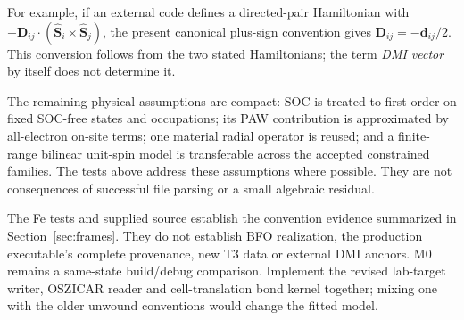 \documentclass[11pt,a4paper]{article}
\numberwithin{equation}{section}
\newcommand{\vct}[1]{\bm{#1}}
\begin{document}
For example, if an external code defines a directed-pair Hamiltonian with
$-\vct D_{ij}\cdot(\hat{\vct S}_i\times\hat{\vct S}_j)$, the present canonical
plus-sign convention gives $\vct D_{ij}=-\vct d_{ij}/2$.
This conversion follows from the two stated Hamiltonians; the term
\emph{DMI vector} by itself does not determine it.

The remaining physical assumptions are compact: SOC is treated to first
order on fixed SOC-free states and occupations; its PAW contribution is
approximated by all-electron on-site terms; one material radial operator
is reused; and a finite-range bilinear unit-spin model is transferable
across the accepted constrained families. The tests above address these
assumptions where possible. They are not consequences of successful file
parsing or a small algebraic residual.

The Fe tests and supplied source establish the convention evidence
summarized in Section~\ref{sec:frames}. They do not establish BFO
realization, the production executable's complete provenance, new T3 data
or external DMI anchors. M0 remains a same-state build/debug comparison.
Implement the revised lab-target writer, OSZICAR reader and
cell-translation bond kernel together; mixing one with the older
unwound conventions would change the fitted model.
\end{document}

